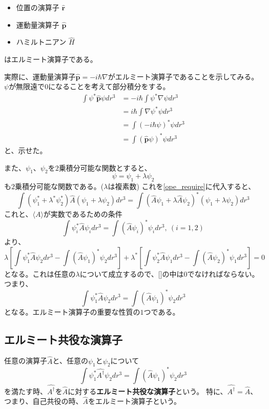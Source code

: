 \begin{itemize}
	\item 位置の演算子 $\hat{\bm{r}}$
	\item 運動量演算子 $\hat{\bm{p}}$
	\item ハミルトニアン $\hat{H}$
\end{itemize}
はエルミート演算子である。

実際に、運動量演算子$\hat{\bm{p}} = -i\hbar\nabla$がエルミート演算子であることを示してみる。
$\psi$が無限遠で$0$になることを考えて部分積分をする。
\begin{align}
	\int \psi^*\hat{\bm{p}}\psi dr^3
	&= -i\hbar \int \psi^* \nabla \psi dr^3 \\
	&= i\hbar \int \nabla \psi^* \psi dr^3 \\
	&= \int (-i\hbar\psi)^*\psi dr^3 \\
	&= \int (\hat{\bm{p}}\psi)^*\psi dr^3
\end{align}
と、示せた。

また、$\psi_1$、$\psi_2$を$2$乗積分可能な関数とすると、
\begin{equation}
	\psi = \psi_1 + \lambda \psi_2
\end{equation}
も$2$乗積分可能な関数である。($\lambda$は複素数)
これを\ref{ope_require}に代入すると、
\begin{equation}
	\int (\psi_1^* + \lambda^* \psi_2^*) \hat{A} (\psi_1 + \lambda \psi_2)dr^3
	= \int (\hat{A}\psi_1 + \lambda \hat{A}\psi_2)^* (\psi_1 + \lambda \psi_2) dr^3
\end{equation}
これと、$\langle A \rangle$が実数であるための条件
\begin{equation}
	\int \psi_i^* \hat{A} \psi_i dr^3 = \int (\hat{A}\psi_i)^*\psi_i dr^3,~(i = 1,2)
\end{equation}
より、
\begin{equation}
	\lambda \left[ \int \psi_1^*\hat{A}\psi_2 dr^3 - \int(\hat{A}\psi_1)^* \psi_2 dr^3 \right] +
	\lambda^* \left[ \int \psi_2^*\hat{A}\psi_1 dr^3 - \int(\hat{A}\psi_2)^* \psi_1 dr^3 \right] = 0
\end{equation}
となる。これは任意の$\lambda$について成立するので、[]の中は$0$でなければならない。
つまり、
\begin{equation}
	\int \psi_1^*\hat{A}\psi_2 dr^3 = \int(\hat{A}\psi_1)^* \psi_2 dr^3
\end{equation}
となる。エルミート演算子の重要な性質の$1$つである。

\subsection{エルミート共役な演算子}
任意の演算子$\hat{A}$と、任意の$\psi_1$と$\psi_2$について
\begin{equation}
	\int \psi_1^*\hat{A^\dagger}\psi_2 dr^3 = \int(\hat{A}\psi_1)^* \psi_2 dr^3
\end{equation}
を満たす時、$\hat{A^\dagger}$を$\hat{A}$に対する{\bf エルミート共役な演算子}という。
特に、$\hat{A^\dagger} = \hat{A}$、つまり、自己共役の時、$\hat{A}$をエルミート演算子という。

